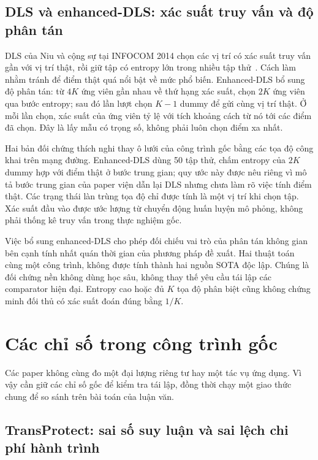 \documentclass[12pt,a4paper,oneside]{report}
\begin{document}
\subsection{DLS và enhanced-DLS: xác suất truy vấn và độ phân tán}

DLS của Niu và cộng sự tại INFOCOM 2014 chọn các vị trí có xác suất truy vấn gần với vị trí thật, rồi giữ tập có entropy lớn trong nhiều tập thử~\cite{niu2014dls}. Cách làm nhằm tránh để điểm thật quá nổi bật về mức phổ biến. Enhanced-DLS bổ sung độ phân tán: từ $4K$ ứng viên gần nhau về thứ hạng xác suất, chọn $2K$ ứng viên qua bước entropy; sau đó lần lượt chọn $K-1$ dummy để gửi cùng vị trí thật. Ở mỗi lần chọn, xác suất của ứng viên tỷ lệ với tích khoảng cách từ nó tới các điểm đã chọn. Đây là lấy mẫu có trọng số, không phải luôn chọn điểm xa nhất.

Hai bản đối chứng thích nghi thay ô lưới của công trình gốc bằng các tọa độ công khai trên mạng đường. Enhanced-DLS dùng 50 tập thử, chấm entropy của $2K$ dummy hợp với điểm thật ở bước trung gian; quy ước này được nêu riêng vì mô tả bước trung gian của paper viện dẫn lại DLS nhưng chưa làm rõ việc tính điểm thật. Các trạng thái làn trùng tọa độ chỉ được tính là một vị trí khi chọn tập. Xác suất đầu vào được ước lượng từ chuyển động huấn luyện mô phỏng, không phải thống kê truy vấn trong thực nghiệm gốc.

Việc bổ sung enhanced-DLS cho phép đối chiếu vai trò của phân tán không gian bên cạnh tính nhất quán thời gian của phương pháp đề xuất. Hai thuật toán cùng một công trình, không được tính thành hai nguồn SOTA độc lập. Chúng là đối chứng nền không dùng học sâu, không thay thế yêu cầu tái lập các comparator hiện đại. Entropy cao hoặc đủ $K$ tọa độ phân biệt cũng không chứng minh đối thủ có xác suất đoán đúng bằng $1/K$.

\section{Các chỉ số trong công trình gốc}
\label{sec:original-metrics}

Các paper không cùng đo một đại lượng riêng tư hay một tác vụ ứng dụng. Vì vậy cần giữ các chỉ số gốc để kiểm tra tái lập, đồng thời chạy một giao thức chung để so sánh trên bài toán của luận văn.

\subsection{TransProtect: sai số suy luận và sai lệch chi phí hành trình}
\end{document}
